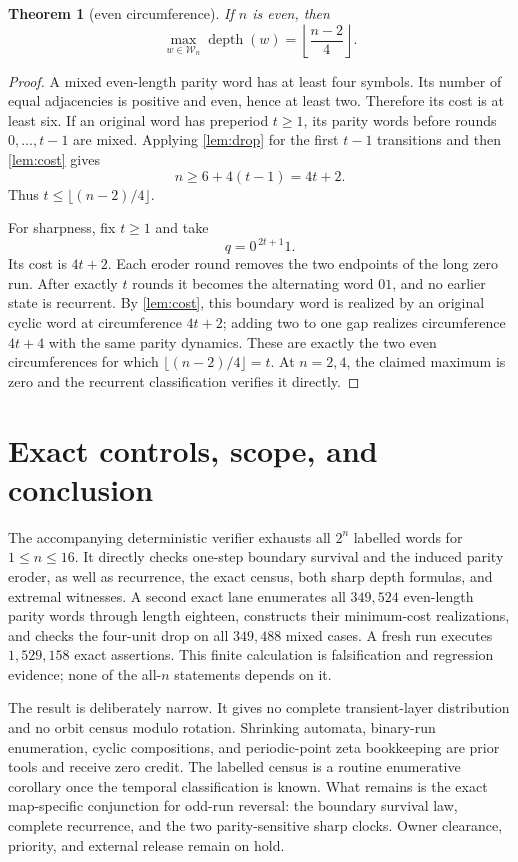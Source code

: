 \documentclass[11pt,a4paper]{amsart}
\newtheorem{theorem}{Theorem}[section]
\theoremstyle{definition}
\theoremstyle{remark}
\newcommand{\depth}{\operatorname{depth}}
\begin{document}
\begin{theorem}[even circumference]\label{thm:even-depth}
If \(n\) is even, then
\[
        \max_{w\in\mathcal W_n}\depth(w)
        =\left\lfloor\frac{n-2}{4}\right\rfloor.
\]
\end{theorem}

\begin{proof}
A mixed even-length parity word has at least four symbols.  Its number of
equal adjacencies is positive and even, hence at least two.  Therefore its
cost is at least six.  If an original word has preperiod \(t\ge1\), its
parity words before rounds \(0,\ldots,t-1\) are mixed.  Applying
\cref{lem:drop} for the first \(t-1\) transitions and then
\cref{lem:cost} gives
\[
                       n\ge6+4(t-1)=4t+2.
\]
Thus \(t\le\lfloor(n-2)/4\rfloor\).

For sharpness, fix \(t\ge1\) and take
\[
                              q=0^{\,2t+1}1.
\]
Its cost is \(4t+2\).  Each eroder round removes the two endpoints of the
long zero run.  After exactly \(t\) rounds it becomes the alternating word
\(01\), and no earlier state is recurrent.  By \cref{lem:cost}, this
boundary word is realized by an original cyclic word at circumference
\(4t+2\); adding two to one gap realizes circumference \(4t+4\) with the
same parity dynamics.  These are exactly the two even circumferences for
which \(\lfloor(n-2)/4\rfloor=t\).  At \(n=2,4\), the claimed maximum is
zero and the recurrent classification verifies it directly.
\end{proof}

\section{Exact controls, scope, and conclusion}

The accompanying deterministic verifier exhausts all \(2^n\) labelled words
for \(1\le n\le16\).  It directly checks one-step boundary survival and the
induced parity eroder, as well as recurrence, the exact census, both sharp
depth formulas, and extremal witnesses.  A second exact lane enumerates all
\(349{,}524\) even-length parity words through length eighteen, constructs
their minimum-cost realizations, and checks the four-unit drop on all
\(349{,}488\) mixed cases.  A fresh run executes \(1{,}529{,}158\) exact
assertions.  This finite calculation is falsification and regression
evidence; none of the all-\(n\) statements depends on it.

The result is deliberately narrow.  It gives no complete transient-layer
distribution and no orbit census modulo rotation.  Shrinking automata,
binary-run enumeration, cyclic compositions, and periodic-point zeta
bookkeeping are prior tools and receive zero credit.  The labelled census is
a routine enumerative corollary once the temporal classification is known.
What remains is the exact map-specific conjunction for odd-run reversal: the
boundary survival law, complete recurrence, and the two parity-sensitive
sharp clocks.  Owner clearance, priority, and external release remain on
hold.



\end{document}
